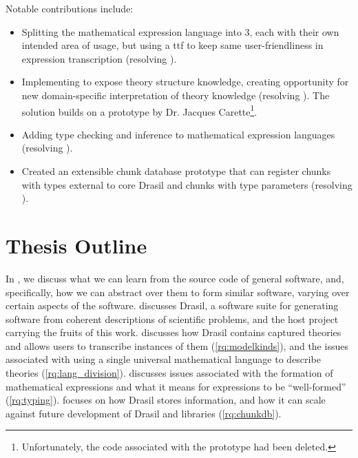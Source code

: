 Notable contributions include:

\begin{itemize}

      \item Splitting the mathematical expression language into 3, each with
            their own intended area of usage, but using a \acs{ttf}
            \cite{Carette2009} to keep same user-friendliness in expression
            transcription (resolving ).

      \item Implementing \ModelKinds{} to expose theory structure knowledge,
            creating opportunity for new domain-specific interpretation of
            theory knowledge (resolving ). The solution
            builds on a prototype by Dr. Jacques Carette\footnote{Unfortunately,
                  the code associated with the prototype had been deleted.}.

      \item Adding type checking and inference to mathematical expression
            languages (resolving ).

      \item Created an extensible chunk database prototype that can register
            chunks with types external to core Drasil and chunks with type
            parameters (resolving ).

\end{itemize}

\section{Thesis Outline}
\label{sec:intro:outline}

In , we discuss what we can learn from the source code of
general software, and, specifically, how we can abstract over them to form
similar software, varying over certain aspects of the software.
 discusses Drasil, a software suite for generating software
from coherent descriptions of scientific problems, and the host project carrying
the fruits of this work.  discusses how Drasil contains
captured theories and allows users to transcribe instances of them
(\ref{rq:modelkinds}), and the issues associated with using a single universal
mathematical language to describe theories (\ref{rq:lang_division}).
 discusses issues associated with the formation of
mathematical expressions and what it means for expressions to be ``well-formed''
(\ref{rq:typing}).  focuses on how Drasil stores
information, and how it can scale against future development of Drasil and
libraries (\ref{rq:chunkdb}).
